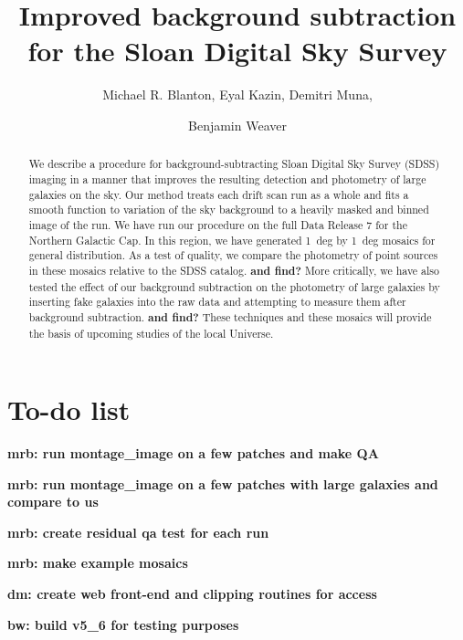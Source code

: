 \documentclass[10pt,preprint]{aastex}
\newcounter{address}
\begin{document}
\title{ Improved background subtraction for the Sloan Digital Sky Survey}


\author{
Michael R. Blanton\altaffilmark{\ref{NYU}},
Eyal Kazin\altaffilmark{\ref{NYU}},
Demitri Muna\altaffilmark{\ref{NYU}}, \and
Benjamin Weaver\altaffilmark{\ref{NYU}}
}

\setcounter{address}{1}

\begin{abstract}
We describe a procedure for background-subtracting Sloan Digital Sky
Survey (SDSS) imaging in a manner that improves the resulting
detection and photometry of large galaxies on the sky. Our method
treats each drift scan run as a whole and fits a smooth function to
variation of the sky background to a heavily masked and binned image
of the run. We have run our procedure on the full Data Release 7 for
the Northern Galactic Cap. In this region, we have generated 1~deg by
1~deg mosaics for general distribution. As a test of quality, we
compare the photometry of point sources in these mosaics relative to
the SDSS catalog. {\bf and find?} More critically, we have also tested
the effect of our background subtraction on the photometry of large
galaxies by inserting fake galaxies into the raw data and attempting
to measure them after background subtraction. {\bf and find?} These
techniques and these mosaics will provide the basis of upcoming
studies of the local Universe.
\end{abstract}

\section{ To-do list}

{\bf mrb: run montage\_image on a few patches and make QA}

{\bf mrb: run montage\_image on a few patches with large galaxies and
compare to us}

{\bf mrb: create residual qa test for each run}

{\bf mrb: make example mosaics}

{\bf dm: create web front-end and clipping routines for access}

{\bf bw: build v5\_6 for testing purposes}
\end{document}
